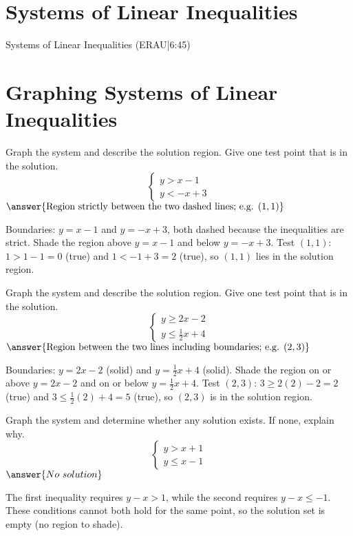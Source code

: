 \documentclass{ximera}
\begin{document}

\section*{Systems of Linear Inequalities}

Systems of Linear Inequalities (ERAU|6:45)



\section*{Graphing Systems of Linear Inequalities}

\begin{problem}
Graph the system and describe the solution region. Give one test point that is in the solution.
\[
\begin{cases}
y > x - 1\\[4pt]
y < -x + 3
\end{cases}
\]
$\answer{\text{Region strictly between the two dashed lines; e.g. }(1,1)}$
\begin{feedback}
Boundaries: $y=x-1$ and $y=-x+3$, both dashed because the inequalities are strict. Shade the region above $y=x-1$ and below $y=-x+3$. Test $(1,1)$: $1>1-1=0$ (true) and $1< -1+3=2$ (true), so $(1,1)$ lies in the solution region.
\end{feedback}
\end{problem}

\begin{problem}
Graph the system and describe the solution region. Give one test point that is in the solution.
\[
\begin{cases}
y \ge 2x - 2\\[4pt]
y \le \tfrac{1}{2}x + 4
\end{cases}
\]
$\answer{\text{Region between the two lines including boundaries; e.g. }(2,3)}$
\begin{feedback}
Boundaries: $y=2x-2$ (solid) and $y=\tfrac{1}{2}x+4$ (solid). Shade the region on or above $y=2x-2$ and on or below $y=\tfrac{1}{2}x+4$. Test $(2,3)$: $3\ge2(2)-2=2$ (true) and $3\le\tfrac{1}{2}(2)+4=5$ (true), so $(2,3)$ is in the solution region.
\end{feedback}
\end{problem}

\begin{problem}
Graph the system and determine whether any solution exists. If none, explain why.
\[
\begin{cases}
y > x + 1\\[4pt]
y \le x - 1
\end{cases}
\]
$\answer{No\ solution}$
\begin{feedback}
The first inequality requires $y-x>1$, while the second requires $y-x\le-1$. These conditions cannot both hold for the same point, so the solution set is empty (no region to shade).
\end{feedback}
\end{problem}
\end{document}
